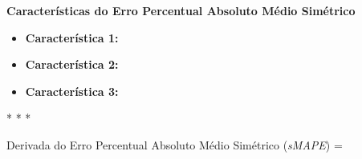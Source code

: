 \textbf{Características do Erro Percentual Absoluto Médio Simétrico}
\vspace{1em}

\begin{itemize}
    \item \textbf{Característica 1:}
    \item \textbf{Característica 2:}
    \item \textbf{Característica 3:}
\end{itemize}

\medskip
\begin{center}
 * * *
\end{center}
\medskip

\begin{equacaodestaque}{Derivada do Erro Percentual Absoluto Médio Simétrico (\textit{sMAPE})}
     =  \cdot {}
    \label{eq:smape-derivada}
\end{equacaodestaque}

